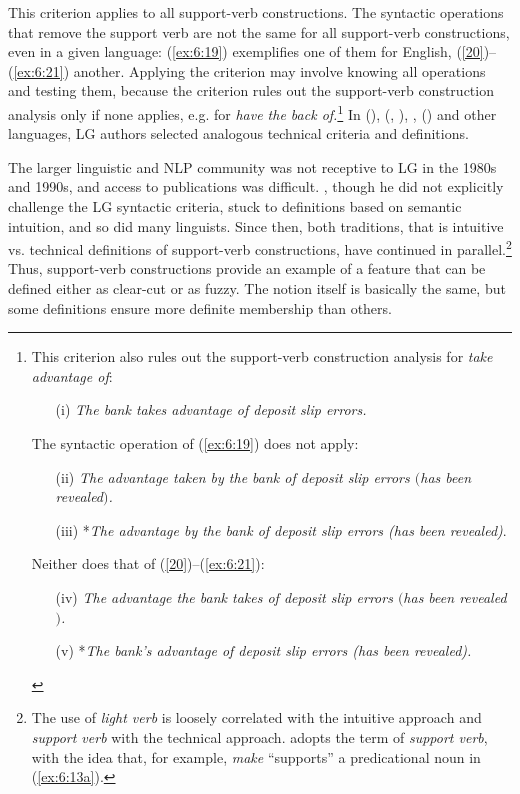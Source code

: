 \documentclass[output=paper]{langsci/langscibook}
\begin{document}
\newpage 
This criterion applies to all support-verb constructions. The syntactic operations that remove the support verb are not the same for all support-verb constructions, even in a given language: (\ref{ex:6:19}) exemplifies one of them for English, (\ref{20})--(\ref{ex:6:21}) another. Applying the criterion may involve knowing all operations and testing them, because the criterion rules out the support-verb construction analysis only if none applies, e.g. for \textit{have the back of.}\footnote{This criterion also rules out the support-verb construction analysis for \textit{take advantage of}: 
\begin{itemize}
\item[(i)] 
\textit{The bank takes advantage of deposit slip errors.} 
\end{itemize}

The syntactic operation of (\ref{ex:6:19}) does not apply:  
\begin{itemize}
\item[(ii)] 
\textit{The advantage taken by the bank of deposit slip errors $($has been revealed$)$.} 
\item[(iii)]  
*\textit{The advantage by the bank of deposit slip errors (has been revealed)}. 
\end{itemize}

Neither does that of (\ref{20})--(\ref{ex:6:21}): 
\begin{itemize}
\item[(iv)] 
\textit{The advantage the bank takes of deposit slip errors $($has been revealed$)$.}
\item[(v)]  
*\textit{The bank’s advantage of deposit slip errors (has been revealed).}
\end{itemize}} 
In  (\citealt{Angelis1989}),  (\citealt{Ranchhod1990}, \citealt{Rassi}),  \citep{Han2000},  (\citealt{Kyriacopoulou2003}) and other languages, LG authors selected analogous technical criteria and definitions. 

The larger linguistic and NLP community was not receptive to LG in the 1980s and 1990s, and access to publications was difficult. \citet{Cattell1984}, though he did not explicitly challenge the LG syntactic criteria, stuck to definitions based on semantic intuition, and so did many linguists. Since then, both traditions, that is intuitive vs. technical definitions of support-verb constructions, have continued in parallel.\footnote{The use of \textit{light verb} is loosely correlated with the intuitive approach and \textit{support verb} with the technical approach. 
\citet[12]{Gross1981} adopts the term of \textit{support verb}, with the idea that, for example, \textit{make} “supports” a predicational noun in (\ref{ex:6:13a}).} Thus, support-verb constructions provide an example of a feature that can be defined either as clear-cut or as fuzzy. The notion itself is basically the same, but some definitions ensure more definite membership than others.
\end{document}

